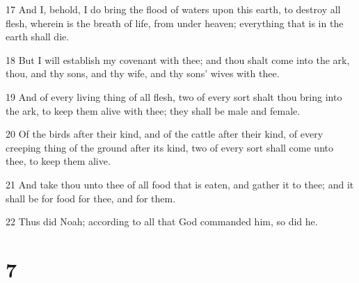 \par 17 And I, behold, I do bring the flood of waters upon this earth, to destroy all flesh, wherein is the breath of life, from under heaven; everything that is in the earth shall die.
\par 18 But I will establish my covenant with thee; and thou shalt come into the ark, thou, and thy sons, and thy wife, and thy sons' wives with thee.
\par 19 And of every living thing of all flesh, two of every sort shalt thou bring into the ark, to keep them alive with thee; they shall be male and female.
\par 20 Of the birds after their kind, and of the cattle after their kind, of every creeping thing of the ground after its kind, two of every sort shall come unto thee, to keep them alive.
\par 21 And take thou unto thee of all food that is eaten, and gather it to thee; and it shall be for food for thee, and for them.
\par 22 Thus did Noah; according to all that God commanded him, so did he.

\chapter{7}

